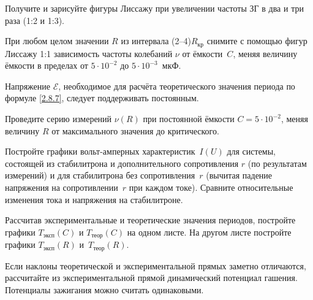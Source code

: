 \begin{lab:task}
Получите и зарисуйте фигуры Лиссажу при увеличении частоты ЗГ в два и три раза
(1:2 и 1:3).

		\item При любом целом значении $R$ из интервала (2--4)$R_{\text{кр}}$
снимите с помощью фигур Лиссажу 1:1 зависимость частоты
колебаний $\nu$ от ёмкости~$C$, меняя величину ёмкости в пределах от
$5\cdot10^{-2}$ до $5\cdot10^{-3}$~мкФ.

Напряжение $\mathcal{E}$, необходимое для расчёта теоретического значения периода по
формуле \eqref{2.8.7}, следует поддерживать
постоянным.

		\item Проведите серию измерений $\nu(R)$ при постоянной ёмкости 
$C=5\cdot10^{-2}$, меняя величину $R$ от максимального
значения до критического.


		\item Постройте графики вольт-амперных характеристик~$I(U)$ для системы, 
        состоящей из стабилитрона и дополнительного сопротивления $r$ 
        (по результатам измерений) и 
        для стабилитрона без сопротивления~$r$ (вычитая падение напряжения
на сопротивлении~$r$ при каждом токе).
Сравните относительные изменения тока и напряжения на стабилитроне.

		\item Рассчитав экспериментальные и теоретические значения периодов,
постройте графики $T_{\text{эксп}}(C)$ и $T_{\text{теор}}(C)$ на
одном листе. На другом листе постройте графики $T_{\text{эксп}}(R)$ и~$T_{\text{теор}}(R)$.

		\item Если наклоны теоретической и экспериментальной прямых заметно
отличаются, рассчитайте из экспериментальной прямой
динамический потенциал гашения. Потенциалы зажигания можно считать одинаковыми.
\end{lab:task}


